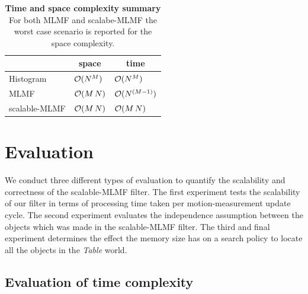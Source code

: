 
\begin{table}
 \centering
 \begin{tabular}{c|c|c|}
\cline{2-3}
				        &    \textbf{space}   &     \textbf{time} \\ \hline
    \multicolumn{1}{|l}{Histogram}      & \multicolumn{1}{|l}{$\operatorname{\mathcal{O}}(N^M)$}   &  \multicolumn{1}{|l|}{$\operatorname{\mathcal{O}}(N^M)$}      \\ \hline
    \multicolumn{1}{|l}{MLMF}           & \multicolumn{1}{|l}{$\operatorname{\mathcal{O}}(M\,N)$}  &  \multicolumn{1}{|l|}{$\operatorname{\mathcal{O}}(N^{(M-1)})$} \\ \hline
    \multicolumn{1}{|l}{scalable-MLMF}  & \multicolumn{1}{|l}{$\operatorname{\mathcal{O}}(M\,N)$}  &  \multicolumn{1}{|l|}{$\operatorname{\mathcal{O}}(M\,N)$}     \\ \hline
   \end{tabular}
   \caption{\textbf{Time and space complexity summary} For both MLMF and scalabe-MLMF the worst case scenario is reported for the space complexity.}
   \label{tab:time_space_summary}
\end{table}



\section{Evaluation}\label{ch5:evaluation}

We conduct three different types of evaluation to quantify the scalability and correctness of the scalable-MLMF filter. The first experiment
tests the scalability of our filter in terms of processing time taken per motion-measurement update cycle. The second experiment evaluates the independence 
assumption between the objects which was made in the scalable-MLMF filter. The third and final experiment determines the effect the 
memory size has on a search policy to locate all the objects in the \textit{Table} world.

\subsection{Evaluation of time complexity}

